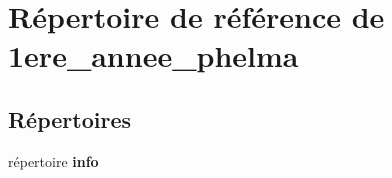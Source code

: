 \section{Répertoire de référence de 1ere\-\_\-annee\-\_\-phelma}
\label{dir_cbe38b1435b9fbbf57e99b11fbdca614}
\subsection*{Répertoires}
\begin{DoxyCompactItemize}
\item 
répertoire {\bf info}
\end{DoxyCompactItemize}
